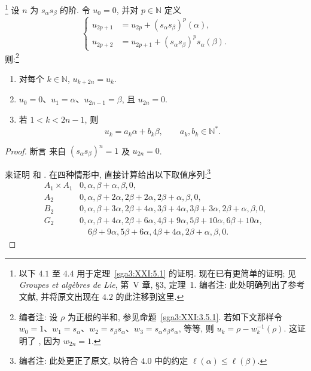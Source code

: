 \begin{proposition}\label{sga3:XXI:4.1}
\footnote{以下 \(4.1\) 至 \(4.4\) 用于定理~\ref{sga3:XXI:5.1} 的证明. 现在已有更简单的证明; 见 \emph{Groupes et algèbres de Lie}, 第~V 章, \S3, 定理~1. 编者注: 此处明确列出了参考文献, 并将原文出现在 \(4.2\) 的此注移到这里.}
设 \(n\) 为 \(s_\alpha s_\beta\) 的阶. 令 \(u_0=0\), 并对 \(p\in\mathbb N\) 定义
\[
\left\{
\begin{aligned}
u_{2p+1}&=u_{2p}+(s_\alpha s_\beta)^p(\alpha),\\
u_{2p+2}&=u_{2p+1}+(s_\alpha s_\beta)^p s_\alpha(\beta).
\end{aligned}
\right.
\]
则:\footnote{编者注: 设 \(\rho\) 为正根的半和, 参见命题~\ref{sga3:XXI:3.5.1}. 若如下文那样令 \(w_0=1\)、\(w_1=s_\alpha\)、\(w_2=s_\beta s_\alpha\)、\(w_3=s_\alpha s_\beta s_\alpha\), 等等, 则 \(u_k=\rho-w_k^{-1}(\rho)\). 这证明了 , 因为 \(w_{2n}=1\).}
\begin{enumerate}
\item[\SGAInlineRefTarget{sga3:XXI:4.1:item:i}(i)] 对每个 \(k\in\mathbb N\), \(u_{k+2n}=u_k\).
\item[\SGAInlineRefTarget{sga3:XXI:4.1:item:ii}(ii)] \(u_0=0\)、\(u_1=\alpha\)、\(u_{2n-1}=\beta\), 且 \(u_{2n}=0\).
\item[(iii)] 若 \(1<k<2n-1\), 则
\[
 u_k=a_k\alpha+b_k\beta,
 \qquad a_k,b_k\in\mathbb N^\ast.
\]
\end{enumerate}
\end{proposition}
\begin{proof}
断言  来自 \((s_\alpha s_\beta)^n=1\) 及 \(u_{2n}=0\).

来证明  和 . 在四种情形中, 直接计算给出以下取值序列:\footnote{编者注: 此处更正了原文, 以符合 \(4.0\) 中的约定 \(\ell(\alpha)\le\ell(\beta)\).}
\[
\begin{array}{c|l}
A_1\times A_1&0,\alpha,\beta+\alpha,\beta,0,\\[2pt]
A_2&0,\alpha,\beta+2\alpha,2\beta+2\alpha,
       2\beta+\alpha,\beta,0,\\[2pt]
B_2&0,\alpha,\beta+3\alpha,2\beta+4\alpha,
       3\beta+4\alpha,3\beta+3\alpha,2\beta+\alpha,\beta,0,\\[2pt]
G_2&0,\alpha,\beta+4\alpha,2\beta+6\alpha,
       4\beta+9\alpha,5\beta+10\alpha,6\beta+10\alpha,\\
   &\quad 6\beta+9\alpha,5\beta+6\alpha,4\beta+4\alpha,
       2\beta+\alpha,\beta,0.
\end{array}
\]
\end{proof}

